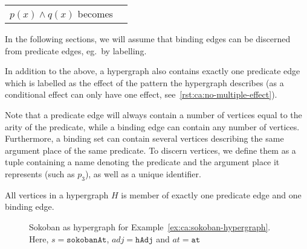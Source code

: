 \documentclass[../Master.tex]{subfiles}
\begin{document}
\begin{description}
\begin{tabular}{c  c}
			$p(x) \land q(x)$ becomes &
            \raisebox{-.5\height}{\resizebox{0.2\linewidth}{!}{}}
		\end{tabular}
	\end{description}

In the following sections, we will assume that binding edges can be discerned from predicate edges, eg.\ by labelling.

In addition to the above, a hypergraph also contains exactly one predicate edge which is labelled as the effect of the pattern the hypergraph describes (as a conditional effect can only have one effect, see~\ref{rst:ca:no-multiple-effect}).

Note that a predicate edge will always contain a number of vertices equal to the arity of the predicate, while a binding edge can contain any number of vertices. Furthermore, a binding set can contain several vertices describing the same argument place of the same predicate. To discern vertices, we define them as a tuple containing a name denoting the predicate and the argument place it represents (such as $p_3$), as well as a unique identifier. 

\begin{proposition}
    All vertices in a hypergraph $H$ is member of exactly one predicate edge and one binding edge.
\end{proposition}

\begin{figure}
    \centering
        
        \caption{Sokoban as hypergraph for Example~\ref{ex:ca:sokoban-hypergraph}. Here, $s = \texttt{sokobanAt}$, $adj = \texttt{hAdj}$ and $at = \texttt{at}$}\label{fig:ca:sokoban-hypergraph}
\end{figure}
\end{document}
